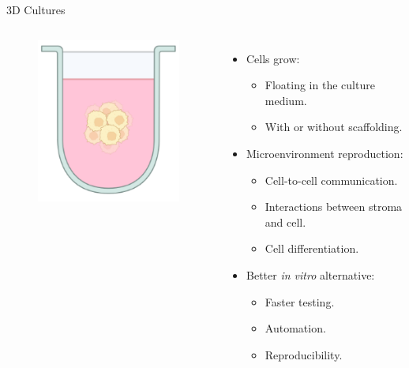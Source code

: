 \begin{frame}{3D Cultures}
    \begin{columns}
        \begin{figure}[!htb]
            \centering
            \includegraphics[width=6cm]{figures/introduction/3D_culture}
        \end{figure}

        \begin{itemize}
            \item<1-> Cells grow:
                \begin{itemize}
                    \item<1-> Floating in the culture medium.
                    \item<2-> With or without scaffolding.
                \end{itemize}
            \item<3-> Microenvironment reproduction:
            \begin{itemize}
                \item<4-> Cell-to-cell communication.
                \item<5-> Interactions between stroma and cell.
                \item<6-> Cell differentiation.
            \end{itemize}
            \item<7-> Better \textit{in vitro} alternative:
            \begin{itemize}
                \item<8-> Faster testing.
                \item<9-> Automation.
                \item<10-> Reproducibility.
            \end{itemize}
        \end{itemize}
    \end{columns}
\end{frame}

